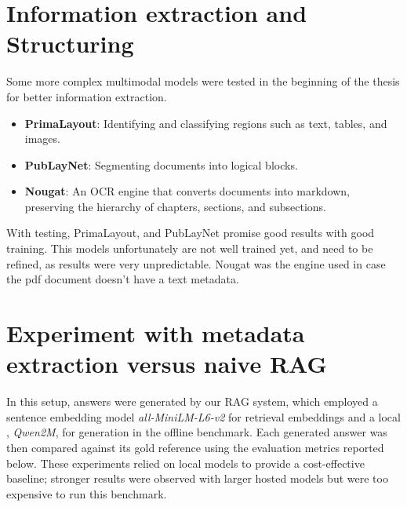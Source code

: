\label{chapter:Results}

\section{Information extraction and Structuring}
Some more complex multimodal models were tested in the beginning of the thesis for better information extraction.
\begin{itemize}
    \item \textbf{PrimaLayout}: Identifying and classifying regions such as text, tables, and images.
    \item \textbf{PubLayNet}: Segmenting documents into logical blocks.
    \item \textbf{Nougat}: An OCR engine that converts documents into markdown, preserving the hierarchy of chapters, sections, and subsections.
\end{itemize}
With testing, PrimaLayout, and PubLayNet promise good results with good training. This models unfortunately are not well trained yet, and need to be refined, as results were very unpredictable. Nougat was the engine used in case the pdf document doesn't have a text metadata.

\section{Experiment with metadata extraction versus naive RAG}
In this setup, answers were generated by our RAG system, which employed a sentence embedding model \textit{all-MiniLM-L6-v2} for retrieval embeddings and a local , \textit{Qwen2M}, for generation in the offline benchmark. 
Each generated answer was then compared against its gold reference using the evaluation metrics reported below. 
These experiments relied on local models to provide a cost-effective baseline; stronger results were observed with larger hosted models but were too expensive to run this benchmark.

